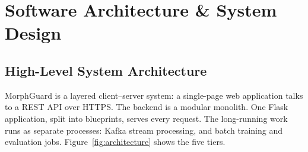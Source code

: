 
\section{Software Architecture \& System Design}

\subsection{High-Level System Architecture}

MorphGuard is a layered client--server system: a single-page web application talks to a REST API over HTTPS. The backend is a modular monolith. One Flask application, split into blueprints, serves every request. The long-running work runs as separate processes: Kafka stream processing, and batch training and evaluation jobs. Figure~\ref{fig:architecture} shows the five tiers.

